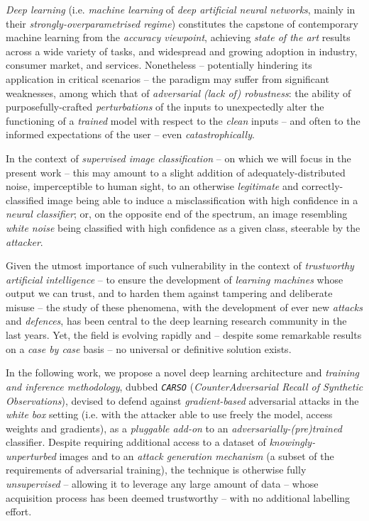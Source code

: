 

\textit{Deep learning} (i.e. \textit{machine learning} of \textit{deep artificial neural networks}, mainly in their \textit{strongly-overparametrised regime}) constitutes the capstone of contemporary machine learning from the \textit{accuracy viewpoint}, achieving \textit{state of the art}  results across a wide variety of tasks, and widespread and growing adoption in industry, consumer market, and services. Nonetheless – potentially hindering its application in critical scenarios – the paradigm may suffer from significant weaknesses, among which that of \textit{adversarial (lack of) robustness}: the ability of purposefully-crafted \textit{perturbations} of the inputs to unexpectedly alter the functioning of a \textit{trained} model with respect to the \textit{clean} inputs – and often to the informed expectations of the user – even \textit{catastrophically}.

In the context of \textit{supervised image classification} – on which we will focus in the present work – this may amount to a slight addition of adequately-distributed noise, imperceptible to human sight, to an otherwise \textit{legitimate} and correctly-classified image being able to induce a misclassification with high confidence in a \textit{neural classifier}; or, on the opposite end of the spectrum, an image resembling \textit{white noise} being classified with high confidence as a given class, steerable by the \textit{attacker}.

Given the utmost importance of such vulnerability in the context of \textit{trustworthy artificial intelligence} – to ensure the development of \textit{learning machines} whose output we can trust, and to harden them against tampering and deliberate misuse – the study of these phenomena, with the development of ever new \textit{attacks} and \textit{defences}, has been central to the deep learning research community in the last years. Yet, the field is evolving rapidly and – despite some remarkable results on a \textit{case by case} basis – no universal or definitive solution exists.

In the following work, we propose a novel deep learning architecture and \textit{training and inference methodology}, dubbed \textit{\texttt{CARSO}} (\textit{CounterAdversarial Recall of Synthetic Observations}), devised to defend against \textit{gradient-based} adversarial attacks in the \textit{white box} setting (i.e. with the attacker able to use freely the model, access weights and gradients), as a \textit{pluggable add-on} to an \textit{adversarially-(pre)trained} classifier. Despite requiring additional access to a dataset of \textit{knowingly-unperturbed} images and to an \textit{attack generation mechanism} (a subset of the requirements of adversarial training), the technique is otherwise fully \textit{unsupervised} – allowing it to leverage any large amount of data – whose acquisition process has been deemed trustworthy – with no additional labelling effort.

